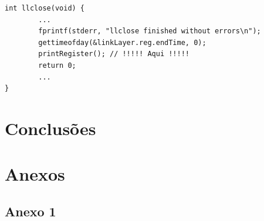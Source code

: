 \documentclass[a4paper]{article}
\begin{document}
\begin{verbatim}
int llclose(void) {
        ...
        fprintf(stderr, "llclose finished without errors\n");
        gettimeofday(&linkLayer.reg.endTime, 0);
        printRegister(); // !!!!! Aqui !!!!!
        return 0;
        ...
}
\end{verbatim}

\section{Conclusões}

\newpage
\section*{Anexos}
\subsection*{Anexo 1}
\end{document}
